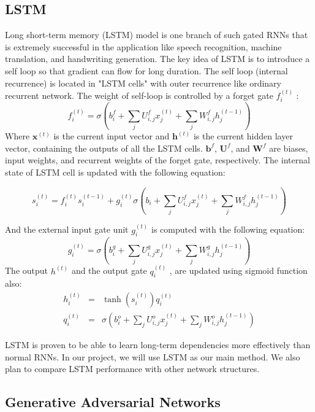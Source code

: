 \subsection{LSTM}
Long short-term memory (LSTM) model \cite{hochreiter1997lstm} is one branch of such gated RNNs that is extremely successful in the application like speech recognition, machine translation, and handwriting generation. 
%
The key idea of LSTM is to introduce a self loop so that gradient can flow for long duration. The self loop (internal recurrence) is located in "LSTM cells" with outer recurrence like ordinary recurrent network. The weight of self-loop is controlled by a forget gate \(f_i^{(t)}\)
:
\[f_i^{(t)} = \sigma (b_i^f + \sum_{j}U_{i,j}^f x_j^{(t)} +\sum_{j}W_{i,j}^f h_j^{(t-1)} ) \]
Where \(\boldsymbol{x}^{(t)}\) is the current input vector and \(\boldsymbol{h}^{(t)}\) is the current hidden layer vector, containing the outputs of all the LSTM cells. \(\boldsymbol{b}^f\), \(\boldsymbol{U}^f\), and \(\boldsymbol{W}^f\) are biases, input weights, and recurrent weights of the forget gate, respectively. The internal state of LSTM cell is updated with the following equation:
\begin{small}
\[s_i^{(t)} = f_i^{(t)}s_i^{(t-1)}+g_i^{(t)}\sigma(b_i + \sum_{j}U_{i,j}^f x_j^{(t)} +\sum_{j}W_{i,j}^f h_j^{(t-1)} )\]
\end{small}
And the external input gate unit 
\(g_i^{(t)} \)
is computed with the following equation:
\[g_i^{(t)} = \sigma (b_i^g + \sum_{j}U_{i,j}^g x_j^{(t)} +\sum_{j}W_{i,j}^g h_j^{(t-1)} ) \]
The output 
\(h^{(t)}\)
and the output gate 
\(q_i^{(t)}\)
, are updated using sigmoid function also:
\begin{eqnarray*}
h_i^{(t)} &=& \tanh (s_i^{(t)})q_i^{(t)}\\
q_i^{(t)} &=& \sigma (b_i^o + \sum_{j}U_{i,j}^o x_j^{(t)} +\sum_{j}W_{i,j}^o h_j^{(t-1)} )
\end{eqnarray*}

LSTM is proven to be able to learn long-term dependencies more effectively than normal RNNs. In our project, we will use LSTM as our main method. We also plan to compare LSTM performance with other network structures.

\subsection{Generative Adversarial Networks}

